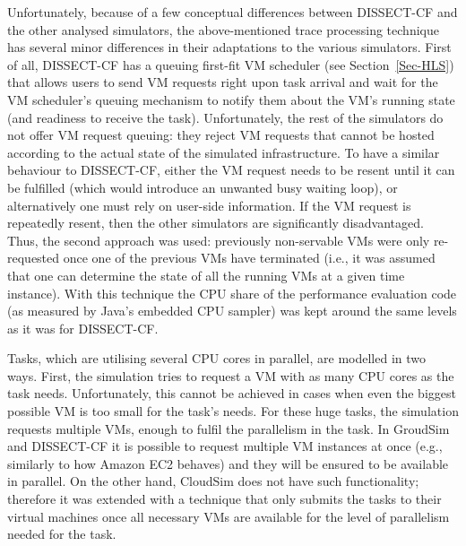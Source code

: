 \documentclass[sort, compress, 5p]{elsarticle}
\begin{document}
Unfortunately, because of a few conceptual differences between DISSECT-CF and the other analysed simulators, the above-mentioned trace processing technique has several minor differences in their adaptations to the various simulators. First of all, DISSECT-CF has a queuing first-fit VM scheduler (see Section~\ref{Sec-HLS}) that allows users to send VM requests right upon task arrival and wait for the VM scheduler's queuing mechanism to notify them about the VM's running state (and readiness to receive the task). Unfortunately, the rest of the simulators do not offer VM request queuing: they reject VM requests that cannot be hosted according to the actual state of the simulated infrastructure. To have a similar behaviour to DISSECT-CF, either the VM request needs to be resent until it can be fulfilled (which would introduce an unwanted busy waiting loop), or alternatively one must rely on user-side information. If the VM request is repeatedly resent, then the other simulators are significantly disadvantaged. Thus, the second approach was used: previously non-servable VMs were only re-requested once one of the previous VMs have terminated (i.e., it was assumed that one can determine the state of all the running VMs at a given time instance). With this technique the CPU share of the performance evaluation code (as measured by Java's embedded CPU sampler) was kept around the same levels as it was for DISSECT-CF.

Tasks, which are utilising several CPU cores in parallel, are modelled in two ways. First, the simulation tries to request a VM with as many CPU cores as the task needs. Unfortunately, this cannot be achieved in cases when even the biggest possible VM is too small for the task's needs. For these huge tasks, the simulation requests multiple VMs, enough to fulfil the parallelism in the task. In GroudSim and DISSECT-CF it is possible to request multiple VM instances at once (e.g., similarly to how Amazon EC2 behaves) and they will be ensured to be available in parallel. On the other hand, CloudSim does not have such functionality; therefore it was extended with a technique that only submits the tasks to their virtual machines once all necessary VMs are available for the level of parallelism needed for the task.
\end{document}
